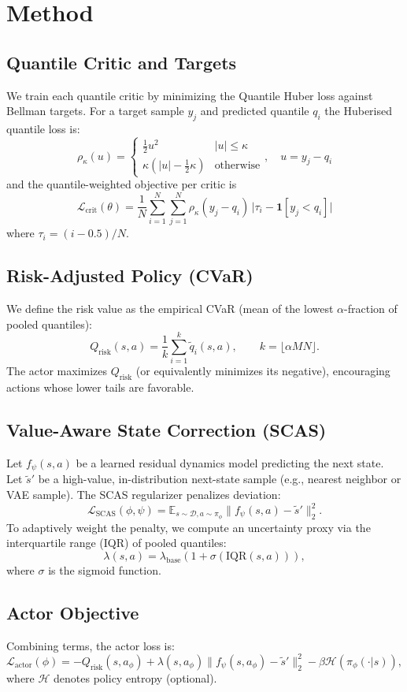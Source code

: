 \documentclass{article}
\begin{document}
\section{Method}
\subsection{Quantile Critic and Targets}
We train each quantile critic by minimizing the Quantile Huber loss against Bellman targets. For a target sample $y_j$ and predicted quantile $q_i$ the Huberised quantile loss is:
\[
\rho_\kappa(u) = 
\begin{cases}
\tfrac{1}{2}u^2 & |u|\le\kappa\\
\kappa(|u|-\tfrac{1}{2}\kappa) & \text{otherwise}
\end{cases},\quad u=y_j-q_i
\]
and the quantile-weighted objective per critic is
\[
\mathcal{L}_\text{crit}(\theta)=\frac{1}{N}\sum_{i=1}^N\sum_{j=1}^N \rho_\kappa(y_j-q_i)\,\big|\tau_i-\mathbf{1}[y_j<q_i]\big|
\]
where $\tau_i=(i-0.5)/N$.

\subsection{Risk-Adjusted Policy (CVaR)}
We define the risk value as the empirical CVaR (mean of the lowest $\alpha$-fraction of pooled quantiles):
\[
Q_{\text{risk}}(s,a)=\frac{1}{k}\sum_{i=1}^k \tilde q_i(s,a),\qquad k=\lfloor \alpha MN\rfloor.
\]
The actor maximizes $Q_{\text{risk}}$ (or equivalently minimizes its negative), encouraging actions whose lower tails are favorable.

\subsection{Value-Aware State Correction (SCAS)}
Let $f_\psi(s,a)$ be a learned residual dynamics model predicting the next state. Let $\tilde s'$ be a high-value, in-distribution next-state sample (e.g., nearest neighbor or VAE sample). The SCAS regularizer penalizes deviation:
\[
\mathcal{L}_\text{SCAS}(\phi,\psi)=\mathbb{E}_{s\sim\mathcal{D},a\sim\pi_\phi}\big\|f_\psi(s,a)-\tilde s'\big\|_2^2.
\]
To adaptively weight the penalty, we compute an uncertainty proxy via the interquartile range (IQR) of pooled quantiles:
\[
\lambda(s,a)=\lambda_\text{base}(1+\sigma(\mathrm{IQR}(s,a))),
\]
where $\sigma$ is the sigmoid function.

\subsection{Actor Objective}
Combining terms, the actor loss is:
\[
\mathcal{L}_\text{actor}(\phi)= -Q_\text{risk}(s,a_\phi) + \lambda(s,a_\phi)\|f_\psi(s,a_\phi)-\tilde s'\|_2^2 - \beta\mathcal{H}(\pi_\phi(\cdot|s)),
\]
where $\mathcal{H}$ denotes policy entropy (optional).
\end{document}
